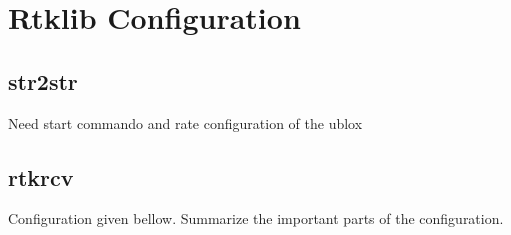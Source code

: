 \chapter{Rtklib Configuration}

\section{str2str}
Need start commando and rate configuration of the ublox

\section{rtkrcv}
Configuration given bellow. Summarize the important parts of the configuration.
